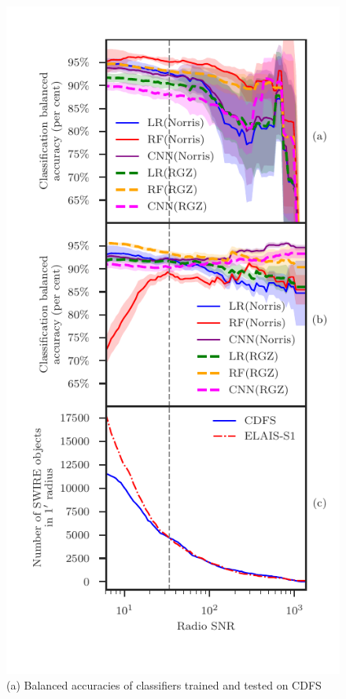   \begin{figure}
    \centering
    \includegraphics[trim={0cm 1cm 0cm 0.5cm}, clip]{atlas-images/accuracies-flux-snr.pdf}
    \caption[Balanced accuracies of classifiers with different SNR cutoffs.]{(a) Balanced accuracies of classifiers trained and tested on CDFS
}
\end{figure}

